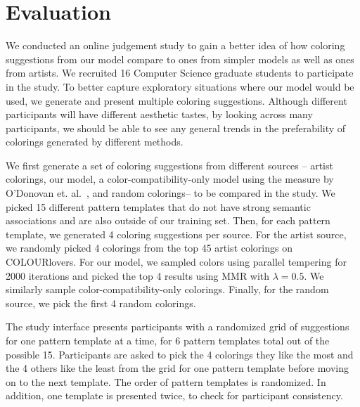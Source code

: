 \section{Evaluation}
\label{sec:evaluation}


We conducted an online judgement study to gain a better idea of how coloring suggestions from our model compare to ones from simpler models as well as ones from artists. We recruited 16 Computer Science graduate students to participate in the study. To better capture exploratory situations where our model would be used, we generate and present multiple coloring suggestions. Although different participants will have different aesthetic tastes, by looking across many participants, we should be able to see any general trends in the preferability of colorings generated by different methods. 

We first generate a set of coloring suggestions from different sources -- artist colorings, our model, a color-compatibility-only model using the measure by O'Donovan et. al.~, and random colorings-- to be compared in the study. We picked 15 different pattern templates that do not have strong semantic associations and are also outside of our training set. Then, for each pattern template, we generated 4 coloring suggestions per source. For the artist source, we randomly picked 4 colorings from the top 45 artist colorings on COLOURlovers. For our model, we sampled colors using parallel tempering for 2000 iterations and picked the top 4 results using MMR with $\lambda = 0.5$. We similarly sample color-compatibility-only colorings. Finally, for the random source, we pick the first 4 random colorings.

The study interface presents participants with a randomized grid of suggestions for one pattern template at a time, for 6 pattern templates total out of the possible 15. Participants are asked to pick the 4 colorings they like the most and the 4 others like the least from the grid for one pattern template before moving on to the next template. The order of pattern templates is randomized. In addition, one template is presented twice, to check for participant consistency. 


